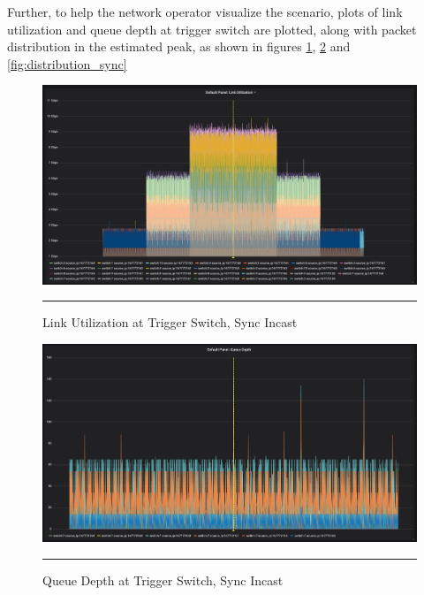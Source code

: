 Further, to help the network operator visualize the scenario, plots of link utilization and queue depth at 
trigger switch are plotted, along with packet distribution in the estimated peak, as shown in figures \ref{fig:link_utilization_sync}, \ref{fig:queue_depth_sync}
and \ref{fig:distribution_sync}

\begin{figure}[htbp]
	\centering
		\includegraphics[width=1.0\columnwidth]{Figures/link_utilization_sync.png}
		\rule{35em}{0.5pt}
	\caption[Link Utilization at Trigger Switch, Sync Incast]{Link Utilization at Trigger Switch, Sync Incast}
	\label{fig:link_utilization_sync}
\end{figure}
\begin{figure}[htbp]
	\centering
		\includegraphics[width=1.0\columnwidth]{Figures/queue_depth_sync.png}
		\rule{35em}{0.5pt}
	\caption[Queue Depth at Trigger Switch, Sync Incast]{Queue Depth at Trigger Switch, Sync Incast}
	\label{fig:queue_depth_sync}
\end{figure}
